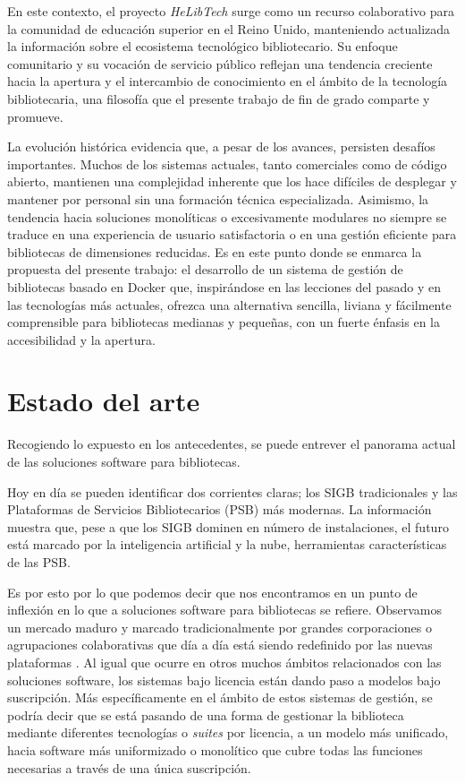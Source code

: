En este contexto, el proyecto \textit{HeLibTech} \parencite{helibtech} surge como un recurso colaborativo para la comunidad de educación superior en el Reino Unido, manteniendo actualizada la información sobre el ecosistema tecnológico bibliotecario. Su enfoque comunitario y su vocación de servicio público reflejan una tendencia creciente hacia la apertura y el intercambio de conocimiento en el ámbito de la tecnología bibliotecaria, una filosofía que el presente trabajo de fin de grado comparte y promueve.

La evolución histórica evidencia que, a pesar de los avances, persisten desafíos importantes. Muchos de los sistemas actuales, tanto comerciales como de código abierto, mantienen una complejidad inherente que los hace difíciles de desplegar y mantener por personal sin una formación técnica especializada. Asimismo, la tendencia hacia soluciones monolíticas o excesivamente modulares no siempre se traduce en una experiencia de usuario satisfactoria o en una gestión eficiente para bibliotecas de dimensiones reducidas. Es en este punto donde se enmarca la propuesta del presente trabajo: el desarrollo de un sistema de gestión de bibliotecas basado en Docker que, inspirándose en las lecciones del pasado y en las tecnologías más actuales, ofrezca una alternativa sencilla, liviana y fácilmente comprensible para bibliotecas medianas y pequeñas, con un fuerte énfasis en la accesibilidad y la apertura.

\section{Estado del arte}
Recogiendo lo expuesto en los antecedentes, se puede entrever el panorama actual de las soluciones software para bibliotecas.

Hoy en día se pueden identificar dos corrientes claras; los SIGB tradicionales y las Plataformas de Servicios Bibliotecarios (PSB) más modernas. La información muestra que, pese a que los SIGB dominen en número de instalaciones, el futuro está marcado por la inteligencia artificial y la nube, herramientas características de las PSB.

Es por esto por lo que podemos decir que nos encontramos en un punto de inflexión en lo que a soluciones software para bibliotecas se refiere. Observamos un mercado maduro y marcado tradicionalmente por grandes corporaciones o agrupaciones colaborativas que día a día está siendo redefinido por las nuevas plataformas \parencite{americanlibraries2026}. Al igual que ocurre en otros muchos ámbitos relacionados con las soluciones software, los sistemas bajo licencia están dando paso a modelos bajo suscripción. Más específicamente en el ámbito de estos sistemas de gestión, se podría decir que se está pasando de una forma de gestionar la biblioteca mediante diferentes tecnologías o \textit{suites} por licencia, a un modelo más unificado, hacia software más uniformizado o monolítico que cubre todas las funciones necesarias a través de una única suscripción.

